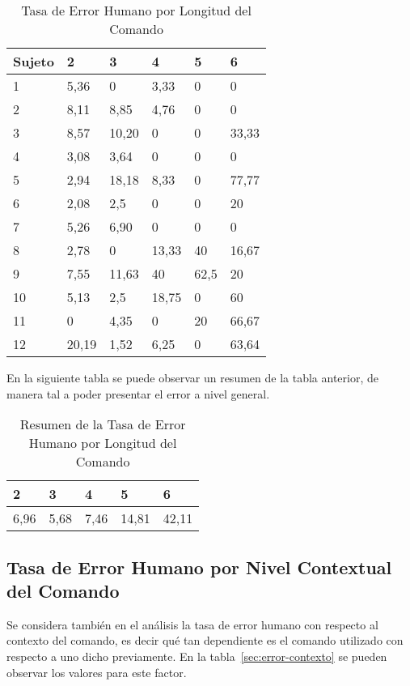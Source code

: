 \begin{table}[H]
\centering
\footnotesize
\begin{tabular}{|p{1.6cm}|p{1.6cm}|p{1.6cm}|p{1.6cm}|p{1.6cm}|p{1.6cm}|}
\hline
    Sujeto & 2 & 3 & 4 & 5 & 6  \\
    \hline 
    1 & 5,36   & 0     & 3,33  &0   &0 \\
    2 & 8,11   & 8,85  & 4,76  &0   &0 \\
    3 & 8,57   & 10,20 & 0 &  0  &33,33 \\
    4 & 3,08   & 3,64 & 0  & 0  & 0 \\
    5 & 2,94   & 18,18 & 8,33 &  0 & 77,77 \\
    6 & 2,08   & 2,5 & 0 & 0 & 20 \\
    7 & 5,26   & 6,90 & 0 & 0 & 0 \\
    8 & 2,78   & 0 & 13,33 & 40 & 16,67 \\
    9 & 7,55   & 11,63 & 40  &  62,5  & 20 \\
    10 & 5,13  & 2,5  & 18,75  &  0 & 60 \\
    11 & 0     & 4,35 & 0 & 20 & 66,67 \\
    12 & 20,19 & 1,52 & 6,25 & 0  & 63,64 \\
\hline
\end{tabular}
\caption{Tasa de Error Humano por Longitud del Comando}
\label{sec:error-longitud}
\end{table}

En la siguiente tabla se puede observar un resumen de la tabla anterior, de manera tal a poder presentar
el error a nivel general.

\begin{table}[H]
\centering
\footnotesize
\begin{tabular}{|p{1.6cm}|p{1.6cm}|p{1.6cm}|p{1.6cm}|p{1.6cm}|}
\hline
    2 & 3 & 4 & 5 & 6  \\
    \hline 
    6,96 & 5,68 & 7,46 & 14,81 & 42,11 \\
    \hline
\end{tabular}
\caption{Resumen de la Tasa de Error Humano por Longitud del Comando}
\label{sec:error-longitud-resumen}
\end{table}


\subsection{Tasa de Error Humano por Nivel Contextual del Comando}

Se considera también en el an\'alisis la tasa de error humano con respecto al contexto del comando, es decir
qu\'e tan dependiente es el comando utilizado con respecto a uno dicho previamente. 
En la tabla~\ref{sec:error-contexto} se pueden observar los valores para este factor.


